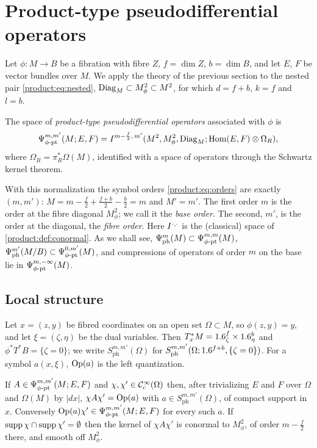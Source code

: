 \section{Product-type pseudodifferential operators}\label{product:sec:operators}

Let $\phi:M\longrightarrow B$ be a fibration with fibre $Z$, $f=\dim Z$,
$b=\dim B$, and let $E$, $F$ be vector bundles over $M$. We apply the theory of
the previous section to the nested pair \eqref{product:eq:nested},
$\operatorname{Diag}_M\subset M^2_\phi\subset M^2$, for which $d=f+b$, $k=f$ and $l=b$.

\begin{definition}\label{product:def:product-type}
The space of \emph{product-type pseudodifferential operators} associated with
$\phi$ is
\begin{equation*}
\Psi^{m,m'}_{\phi\text{-}\mathrm{pt}}(M;E,F)=I^{m-\frac f2,\,m'}(M^2,M^2_\phi,\operatorname{Diag}_M;\operatorname{Hom}(E,F)\otimes\Omega_R),
\end{equation*}
where $\Omega_R=\pi_R^*\Omega(M)$, identified with a space of operators through
the Schwartz kernel theorem.
\end{definition}

With this normalization the symbol orders \eqref{product:eq:orders} are exactly
$(m,m')$: $M=m-\frac f2+\frac{f+b}2-\frac b2=m$ and $M'=m'$. The first order $m$
is the order at the fibre diagonal $M^2_\phi$; we call it the \emph{base order}.
The second, $m'$, is the order at the diagonal, the \emph{fibre order}. Here
$I^{\cdot,\cdot}$ is the (classical) space of \cref{product:def:conormal}. As we
shall see, $\Psi^{m}_{\mathrm{ph}}(M)\subset\Psi^{m,m}_{\phi\text{-}\mathrm{pt}}(M)$,
$\Psi^{m'}_{\mathrm{ph}}(M/B)\subset\Psi^{0,m'}_{\phi\text{-}\mathrm{pt}}(M)$,
and compressions of operators of order $m$ on the base lie in
$\Psi^{m,-\infty}_{\phi\text{-}\mathrm{pt}}(M)$.

\subsection{Local structure}
Let $x=(z,y)$ be fibred coordinates on an open set $\Omega\subset M$, so
$\phi(z,y)=y$, and let $\xi=(\zeta,\eta)$ be the dual variables. Then
$T^*_xM=1.6^f_\zeta\times1.6^b_\eta$ and $\phi^*T^*B=\{\zeta=0\}$; we write
$S^{m,m'}_{\mathrm{ph}}(\Omega)$ for $S^{m,m'}_{\mathrm{ph}}(\Omega;1.6^{f+b},\{\zeta=0\})$.
For a symbol $a(x,\xi)$, $\operatorname{Op}(a)$ is the left quantization.

\begin{proposition}\label{product:prop:local-form}
If $A\in\Psi^{m,m'}_{\phi\text{-}\mathrm{pt}}(M;E,F)$ and $\chi,\chi'\in\mathcal{C}^\infty_{\mathrm{c}}(\Omega)$ then, after
trivializing $E$ and $F$ over $\Omega$ and $\Omega(M)$ by $|dx|$,
$\chi A\chi'=\operatorname{Op}(a)$ with $a\in S^{m,m'}_{\mathrm{ph}}(\Omega)$, of compact support in
$x$. Conversely $\operatorname{Op}(a)\chi'\in\Psi^{m,m'}_{\phi\text{-}\mathrm{pt}}(M;E,F)$ for every such $a$. If
$\operatorname{supp}\chi\cap\operatorname{supp}\chi'=\emptyset$ then the kernel of $\chi A\chi'$ is conormal to
$M^2_\phi$, of order $m-\frac f2$ there, and smooth off $M^2_\phi$.
\end{proposition}

